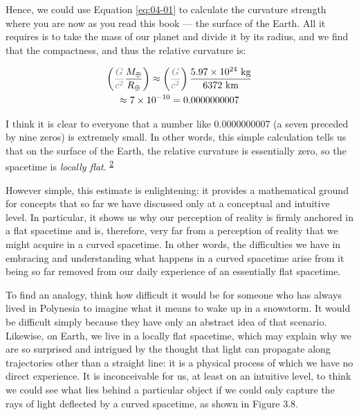 Hence, we could use Equation \eqref{eq:04-01} to calculate the curvature strength where you are now
as you read this book --- the surface of the Earth. All it requires is to take the mass
of our planet and divide it by its radius, and we find that the
compactness, and thus the relative curvature is:

\begin{equation}\label{eq:04-02}
\begin{gathered}
\left(\textcolor{gray}{\frac{G}{c^{2}}}\frac{M_{\oplus}}{R_{\oplus}}\right)
\approx \left(\textcolor{gray}{\frac{G}{c^{2}}}\right)\frac{5.97\times 10^{24}\ \mathrm{kg}}{6372\ \mathrm{km}} \\
\approx 7\times 10^{-10}=0.0000000007
\end{gathered}
\end{equation}


I think it is clear to everyone that a number like 0.0000000007 (a seven preceded by
nine zeros) is extremely small. In other words, this simple calculation tells us that on
the surface of the Earth, the relative curvature is essentially zero, so the spacetime
is \emph{locally flat}. \textsuperscript{\hyperlink{note:04-02}{2}}

However simple, this estimate is enlightening: it provides a mathematical ground for
concepts that so far we have discussed only at a conceptual and intuitive level. In
particular, it shows us why our perception of reality is firmly
anchored in a flat spacetime and is, therefore, very far from a perception of reality
that we might acquire in a curved spacetime. In other words, the difficulties we have in
embracing and understanding what happens in a curved spacetime arise from it being so
far removed from our daily experience of an essentially flat spacetime.

To find an analogy, think how difficult it would be for someone who has always lived in
Polynesia to imagine what it means to wake up in a snowstorm. It would be difficult
simply because they have only an abstract idea of that scenario. Likewise, on Earth, we
live in a locally flat spacetime, which may explain why we are so
surprised and intrigued by the thought that light can propagate along trajectories other
than a straight line: it is a physical process of which we have no direct experience. It
is inconceivable for us, at least on an intuitive level, to think we could see what lies
behind a particular object if we could only capture the rays of light deflected by a
curved spacetime, as shown in Figure 3.8.

